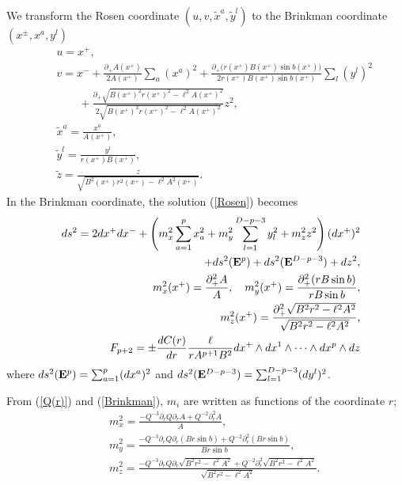 \documentclass[a4paper,12pt]{article}
\begin{document}
We transform the Rosen coordinate $(u,v,\tilde{x}^a,\tilde{y}^l)$ to
the Brinkman coordinate $(x^{\pm}, x^a,y^l)$
\begin{eqnarray}
&&u=x^{+}, \nonumber \\
&&v=x^{-}+\frac{\partial_+A(x^{+})}{2A(x^{+})}\sum_a(x^a)^2
+\frac{\partial_+\bigl(r(x^{+})B(x^{+})\sin b(x^+)\bigr)}
{2r(x^{+})B(x^{+})\sin b(x^+)}
\sum_l(y^l)^2
\nonumber \\
&&\quad\quad
+\frac{\partial_+\sqrt{B(x^{+})^2r(x^{+})^2-\ell^2A(x^{+})^2}}
{2\sqrt{B(x^{+})^2r(x^{+})^2-\ell^2A(x^{+})^2}}z^2,
\nonumber \\
&&\tilde{x}^a=\frac{x^a}{A(x^{+})},\nonumber \\
&&\tilde{y}^l=\frac{y^l}{r(x^{+})B(x^{+})}, \nonumber \\
&&\tilde{z}=\frac{z}{\sqrt{B^2(x^{+})r^2(x^{+})-\ell^2A^2(x^{+})}}.
\end{eqnarray}
In the Brinkman coordinate, the solution (\ref{Rosen}) becomes 
\begin{eqnarray}
&&ds^2=2dx^{+}dx^{-}+\left(
m_x^2\sum_{a=1}^{p}x_a^2 +m_y^2\sum_{l=1}^{D-p-3}y_l^2
+m_z^2z^2
\right)(dx^+)^2
\nonumber \\
&&\quad\quad\quad
+ds^2({\bf E}^{p})+ds^2({\bf E}^{D-p-3})+dz^2,
\nonumber \\
&&m_x^2(x^+)=\frac{\partial_+^2 A}{A},
\quad
m_y^2(x^+)=\frac{\partial_+^2(rB\sin b)}{rB\sin b},
\nonumber \\
&&m_z^2(x^+)=\frac{\partial_+^2\sqrt{B^2r^2-\ell^2A^2}}{\sqrt{B^2r^2-\ell^2A^2}},
\nonumber \\
&&F_{p+2}=\pm \frac{dC(r)}{dr}\frac{\ell}{rA^{p+1}B^2}
dx^{+}\wedge dx^{1}\wedge \cdots \wedge dx^{p}\wedge dz
\label{Brinkman}
\end{eqnarray}
where $ds^2({\bf E}^{p})=\sum_{a=1}^{p}(dx^a)^2$ and  
$ds^2({\bf E}^{D-p-3})=\sum_{l=1}^{D-p-3}(dy^l)^2$.

From (\ref{Q(r)}) and (\ref{Brinkman}), 
$m_i$ are written as functions of the coordinate $r$;
\begin{eqnarray}
&&m_x^2=\frac{-Q^{-3}\partial_rQ\partial_rA+Q^{-2}\partial_r^2A}{A},
\nonumber \\
&&m_y^2=\frac{-Q^{-3}\partial_rQ\partial_r(Br\sin b)
+Q^{-2}\partial_r^2(Br\sin b)}{Br\sin b},
\nonumber \\
&&m_z^2=\frac{-Q^{-3}\partial_rQ\partial_r\sqrt{B^2r^2-\ell^2A^2}
+Q^{-2}\partial_r^2\sqrt{B^2r^2-\ell^2A^2}}{\sqrt{B^2r^2-\ell^2A^2}}.
\label{WS mass}
\end{eqnarray}
\end{document}
